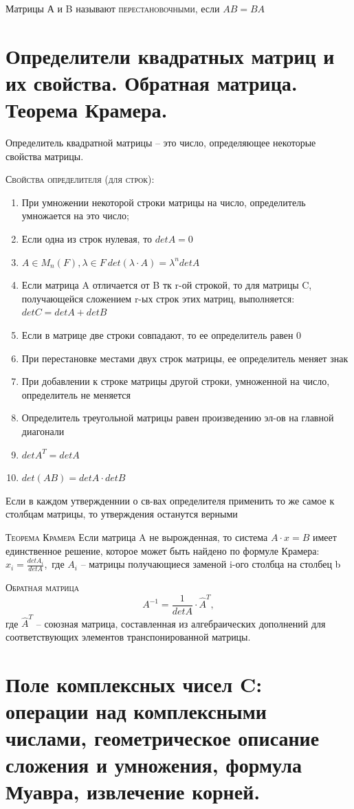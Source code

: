 \documentclass{article}
\begin{document}
Матрицы А и B называют \textsc{перестановочными}, если $AB=BA$

\section{Определители квадратных матриц и их свойства. Обратная матрица. Теорема Крамера.}
Определитель квадратной матрицы – это число, определяющее некоторые свойства матрицы.

\textsc{Свойства определителя (для строк):}
\begin{enumerate}
    \item При умножении некоторой строки матрицы на число, определитель умножается на это число;
    \item Если одна из строк нулевая, то $det A=0$
    \item $A\in M_n(F), \lambda \in F \ det(\lambda\cdot A)=\lambda^ndet A$
    \item Если матрица A отличается от B тк r-ой строкой, то для матрицы C, получающейся сложением r-ых строк этих матриц, выполняется: $det C=det A+det B$
    \item Если в матрице две строки совпадают, то ее определитель равен 0
    \item При перестановке местами двух строк матрицы, ее определитель меняет знак
    \item При добавлении к строке матрицы другой строки, умноженной на число, определитель не меняется
    \item Определитель треугольной матрицы равен произведению эл-ов на главной диагонали
    \item $det A^T=det A$
    \item $det(AB)=det A\cdot det B$
\end{enumerate}
Если в каждом утвержденнии о св-вах определителя применить то же самое к столбцам матрицы, то утверждения останутся верными

\textsc{Теорема Крамера} Если матрица A не вырожденная, то система $A\cdot x=B$ имеет единственное решение,
которое может быть найдено по формуле Крамера: $x_i=\frac{det A_i}{det A}$, где $A_i$ – матрицы получающиеся заменой i-ого столбца на столбец b

\textsc{Обратная матрица}
$$A^{-1}=\frac{1}{det A}\cdot \hat{A}^T,$$
где $\hat{A}^T$ – союзная матрица, составленная из алгебраических дополнений для соответствующих элементов транспонированной матрицы.

\section{Поле комплексных чисел C: операции над комплексными числами, геометрическое описание сложения и умножения, формула Муавра, извлечение корней.}
\end{document}
